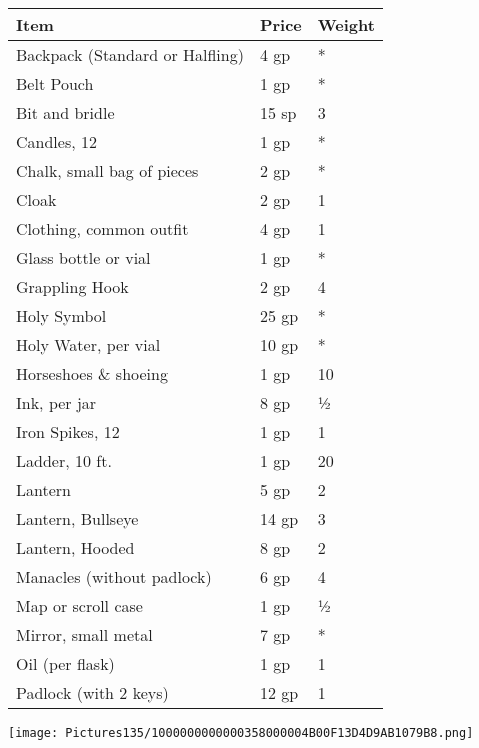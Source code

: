 \documentclass[a4paper,twoside,openany,10pt]{book}
\begin{document}
\begin{multicols}{2}
\begin{tabular*}{0.93\linewidth}{@{\extracolsep{\fill}}lll}
\textbf{Item} & \textbf{Price} & \textbf{Weight} \\\toprule
Backpack (Standard or Halfling) & 4 gp & * \\\hline
Belt Pouch & 1 gp & * \\\hline
Bit and bridle & 15 sp & 3 \\\hline
Candles, 12 & 1 gp & * \\\hline
Chalk, small bag of pieces & 2 gp & * \\\hline
Cloak & 2 gp & 1 \\\hline
Clothing, common outfit & 4 gp & 1 \\\hline
Glass bottle or vial & 1 gp & * \\\hline
Grappling Hook & 2 gp & 4 \\\hline
Holy Symbol & 25 gp & * \\\hline
Holy Water, per vial & 10 gp & * \\\hline
Horseshoes \& shoeing & 1 gp & 10 \\\hline
Ink, per jar & 8 gp & ½ \\\hline
Iron Spikes, 12 & 1 gp & 1 \\\hline
Ladder, 10 ft. & 1 gp & 20 \\\hline
Lantern & 5 gp & 2 \\\hline
Lantern, Bullseye & 14 gp & 3 \\\hline
Lantern, Hooded & 8 gp & 2 \\\hline
Manacles (without padlock) & 6 gp & 4 \\\hline
Map or scroll case & 1 gp & ½ \\\hline
Mirror, small metal & 7 gp & * \\\hline
Oil (per flask) & 1 gp & 1 \\\hline
Padlock (with 2 keys) & 12 gp & 1 \\\bottomrule
\end{tabular*}

\texttt{[image: Pictures135/1000000000000358000004B00F13D4D9AB1079B8.png]}
\vfill


\end{multicols}
\end{document}
